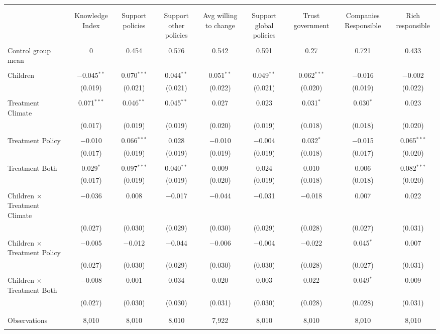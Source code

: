 
\begin{tabular}{@{\extracolsep{5pt}}lcccccccc} 
\\[-1.8ex]\hline 
\hline \\[-1.8ex] 
\\[-1.8ex] & Knowledge Index & Support policies & Support other policies & Avg willing to change & Support global policies & Trust government & Companies Responsible & Rich responsible \\ 
\hline \\[-1.8ex] 
 Control group mean & 0 & 0.454 & 0.576 & 0.542 & 0.591 & 0.27 & 0.721 & 0.433  \\ \hline \\[-1.8ex] Children & $-$0.045$^{**}$ & 0.070$^{***}$ & 0.044$^{**}$ & 0.051$^{**}$ & 0.049$^{**}$ & 0.062$^{***}$ & $-$0.016 & $-$0.002 \\ 
  & (0.019) & (0.021) & (0.021) & (0.022) & (0.021) & (0.020) & (0.019) & (0.022) \\ 
  & & & & & & & & \\ 
 Treatment Climate & 0.071$^{***}$ & 0.046$^{**}$ & 0.045$^{**}$ & 0.027 & 0.023 & 0.031$^{*}$ & 0.030$^{*}$ & 0.023 \\ 
  & (0.017) & (0.019) & (0.019) & (0.020) & (0.019) & (0.018) & (0.018) & (0.020) \\ 
  & & & & & & & & \\ 
 Treatment Policy & $-$0.010 & 0.066$^{***}$ & 0.028 & $-$0.010 & $-$0.004 & 0.032$^{*}$ & $-$0.015 & 0.065$^{***}$ \\ 
  & (0.017) & (0.019) & (0.019) & (0.019) & (0.019) & (0.018) & (0.017) & (0.020) \\ 
  & & & & & & & & \\ 
 Treatment Both & 0.029$^{*}$ & 0.097$^{***}$ & 0.040$^{**}$ & 0.009 & 0.024 & 0.010 & 0.006 & 0.082$^{***}$ \\ 
  & (0.017) & (0.019) & (0.019) & (0.020) & (0.019) & (0.018) & (0.018) & (0.020) \\ 
  & & & & & & & & \\ 
 Children $\times$ Treatment Climate & $-$0.036 & 0.008 & $-$0.017 & $-$0.044 & $-$0.031 & $-$0.018 & 0.007 & 0.022 \\ 
  & (0.027) & (0.030) & (0.029) & (0.030) & (0.029) & (0.028) & (0.027) & (0.031) \\ 
  & & & & & & & & \\ 
 Children $\times$ Treatment Policy & $-$0.005 & $-$0.012 & $-$0.044 & $-$0.006 & $-$0.004 & $-$0.022 & 0.045$^{*}$ & 0.007 \\ 
  & (0.027) & (0.030) & (0.029) & (0.030) & (0.030) & (0.028) & (0.027) & (0.031) \\ 
  & & & & & & & & \\ 
 Children $\times$ Treatment Both & $-$0.008 & 0.001 & 0.034 & 0.020 & 0.003 & 0.022 & 0.049$^{*}$ & 0.009 \\ 
  & (0.027) & (0.030) & (0.030) & (0.031) & (0.030) & (0.028) & (0.028) & (0.031) \\ 
  & & & & & & & & \\ 
\hline \\[-1.8ex] 

Observations & 8,010 & 8,010 & 8,010 & 7,922 & 8,010 & 8,010 & 8,010 & 8,010 \\ 
\hline 
\hline \\[-1.8ex] 
\end{tabular} 